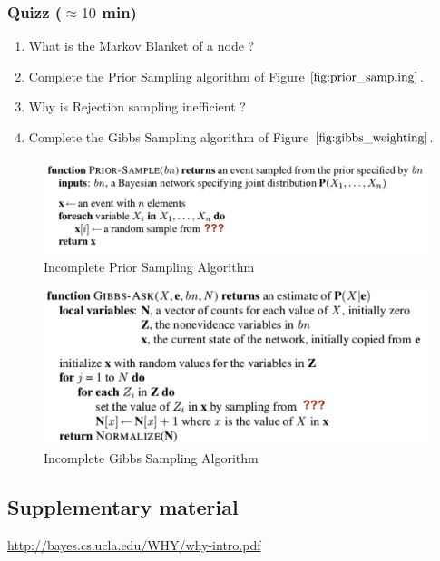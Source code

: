 \documentclass[a4paper, 10pt]{article}
\begin{document}
\subsubsection{Quizz ($\approx 10$ min)}
\begin{enumerate}
    \item What is the Markov Blanket of a node ?
    \item Complete the Prior Sampling algorithm of Figure $\ref{fig:prior_sampling}$.
    \item Why is Rejection sampling inefficient ?
    \item Complete the Gibbs Sampling algorithm of Figure $\ref{fig:gibbs_weighting}$.
\end{enumerate}
\begin{figure}
    \centering
    \includegraphics[width=1.\textwidth]{figures/prior_sampling.png}
    \caption{Incomplete Prior Sampling Algorithm}
    \label{fig:prior_sampling}
\end{figure}
\begin{figure}
    \centering
    \includegraphics[width=1.\textwidth]{figures/gibbs_weighting.png}
    \caption{Incomplete Gibbs Sampling Algorithm}
    \label{fig:gibbs_weighting}
\end{figure}
   \subsection{Supplementary material}
   \url{http://bayes.cs.ucla.edu/WHY/why-intro.pdf}
   
 
   
   
\end{document}
